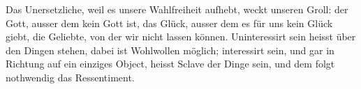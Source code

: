 Das Unersetzliche, weil es unsere Wahlfreiheit aufhebt, weckt unseren Groll: der Gott, ausser dem kein Gott ist, das Glück, ausser dem es für uns kein Glück giebt, die Geliebte, von der wir nicht lassen können. Uninteressirt sein heisst über den Dingen stehen, dabei ist Wohlwollen möglich; interessirt sein, und gar in Richtung auf ein einziges Object, heisst Sclave der Dinge sein, und dem folgt nothwendig das Ressentiment.
\par

